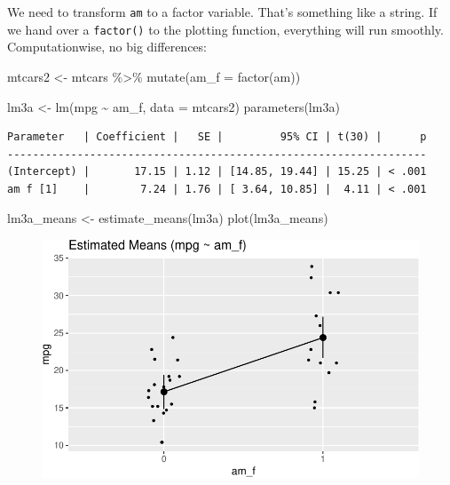 \documentclass[
  letterpaper,
  DIV=11,
  numbers=noendperiod]{scrreprt}
\newenvironment{Shaded}{\begin{snugshade}}{\end{snugshade}}
\newcommand{\AttributeTok}[1]{\textcolor[rgb]{0.40,0.45,0.13}{#1}}
\newcommand{\FunctionTok}[1]{\textcolor[rgb]{0.28,0.35,0.67}{#1}}
\newcommand{\NormalTok}[1]{\textcolor[rgb]{0.00,0.23,0.31}{#1}}
\newcommand{\OtherTok}[1]{\textcolor[rgb]{0.00,0.23,0.31}{#1}}
\newcommand{\SpecialCharTok}[1]{\textcolor[rgb]{0.37,0.37,0.37}{#1}}
\theoremstyle{definition}
\theoremstyle{definition}
\theoremstyle{remark}
\begin{document}
We need to transform \texttt{am} to a factor variable. That's something
like a string. If we hand over a \texttt{factor()} to the plotting
function, everything will run smoothly. Computationwise, no big
differences:

\begin{Shaded}
\begin{Highlighting}[]
\NormalTok{mtcars2 }\OtherTok{\textless{}{-}}
\NormalTok{  mtcars }\SpecialCharTok{\%\textgreater{}\%} 
  \FunctionTok{mutate}\NormalTok{(}\AttributeTok{am\_f =} \FunctionTok{factor}\NormalTok{(am))}

\NormalTok{lm3a }\OtherTok{\textless{}{-}} \FunctionTok{lm}\NormalTok{(mpg }\SpecialCharTok{\textasciitilde{}}\NormalTok{ am\_f, }\AttributeTok{data =}\NormalTok{ mtcars2)}
\FunctionTok{parameters}\NormalTok{(lm3a)}
\end{Highlighting}
\end{Shaded}

\begin{verbatim}
Parameter   | Coefficient |   SE |         95% CI | t(30) |      p
------------------------------------------------------------------
(Intercept) |       17.15 | 1.12 | [14.85, 19.44] | 15.25 | < .001
am f [1]    |        7.24 | 1.76 | [ 3.64, 10.85] |  4.11 | < .001
\end{verbatim}

\begin{Shaded}
\begin{Highlighting}[]
\NormalTok{lm3a\_means }\OtherTok{\textless{}{-}} \FunctionTok{estimate\_means}\NormalTok{(lm3a)}
\FunctionTok{plot}\NormalTok{(lm3a\_means)}
\end{Highlighting}
\end{Shaded}

\begin{figure}[H]

{\centering \includegraphics{./regression1_files/figure-pdf/unnamed-chunk-13-1.pdf}

}

\end{figure}
\end{document}
